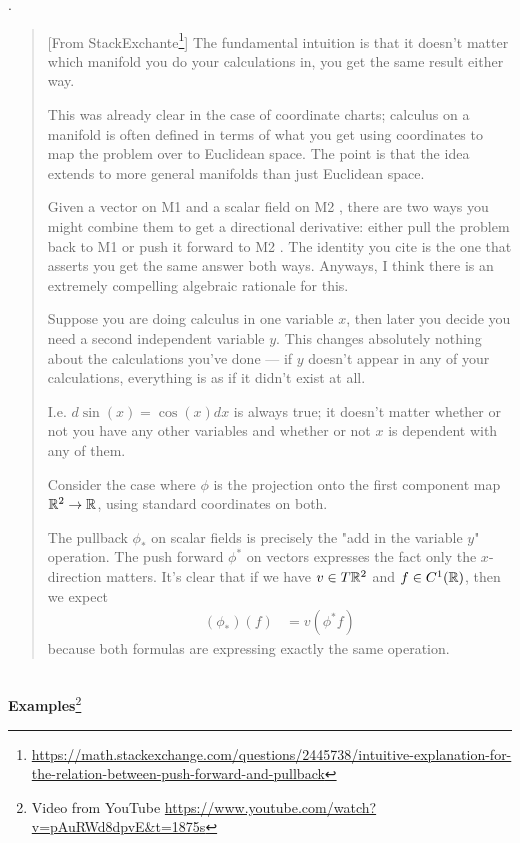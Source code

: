 \documentclass[12pt,a4paper]{report}
\begin{document}
\HLINE
\begin{remark}.
\begin{quote}[From StackExchante\footnote{\url{https://math.stackexchange.com/questions/2445738/intuitive-explanation-for-the-relation-between-push-forward-and-pullback}}]
The fundamental intuition is that it doesn't matter which manifold you do your calculations in, you get the same result either way.

This was already clear in the case of coordinate charts; calculus on a manifold is often defined in terms of what you get using coordinates to map the problem over to Euclidean space. The point is that the idea extends to more general manifolds than just Euclidean space.

Given a vector on M1
 and a scalar field on M2
, there are two ways you might combine them to get a directional derivative: either pull the problem back to M1
 or push it forward to M2
. The identity you cite is the one that asserts you get the same answer both ways.
\HLINE
Anyways, I think there is an extremely compelling algebraic rationale for this.

Suppose you are doing calculus in one variable $x$, then later you decide you need a second independent variable $y$. This changes absolutely nothing about the calculations you've done — if $y$ doesn't appear in any of your calculations, everything is as if it didn't exist at all.

I.e. $d\sin(x)=\cos(x)dx$  is always true; it doesn't matter whether or not you have any other variables and whether or not $x$ is dependent with any of them.

Consider the case where $\phi$ is the projection onto the first component map $\mathbb{R}^2\to \mathbb{R}$, using standard coordinates on both.

The pullback $\phi_*$ on scalar fields is precisely the "add in the variable $y$" operation. The push forward $\phi^*$ on vectors expresses the fact only the $x$-direction matters. It's clear that if we have $v \in T\mathbb{R}^2$ and $f \in C^1(\mathbb{R})$, then we expect
\begin{align*}
	(\phi_*)(f) &= v(\phi^*f)
\end{align*}because both formulas are expressing exactly the same operation.
\end{quote}
\end{remark}

\noindent \textbf{\\\large{Examples}}\footnote{Video from YouTube \url{https://www.youtube.com/watch?v=pAuRWd8dpvE&t=1875s}}
\end{document}
